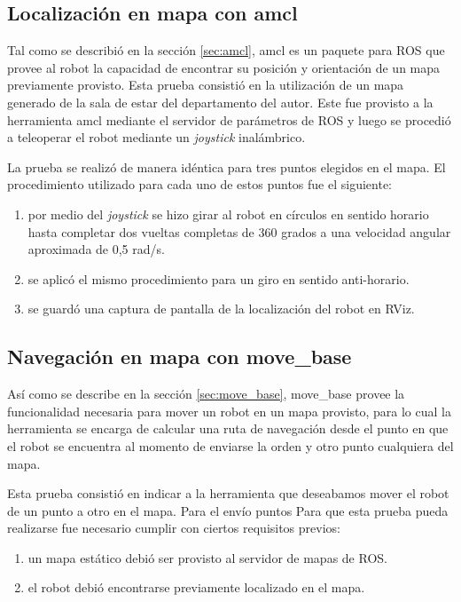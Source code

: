
\subsection{Localización en mapa con amcl}

Tal como se describió en la sección \ref{sec:amcl}, amcl es un paquete para ROS que provee al robot la capacidad de encontrar su posición y orientación de un mapa previamente provisto. Esta prueba consistió en la utilización de un mapa generado de la sala de estar del departamento del autor. Este fue provisto a la herramienta amcl mediante el servidor de parámetros de ROS y luego se procedió a teleoperar el robot mediante un \textit{joystick} inalámbrico.

La prueba se realizó de manera idéntica para tres puntos elegidos en el mapa. El procedimiento utilizado para cada uno de estos puntos fue el siguiente:

\begin{enumerate}
    \item por medio del \textit{joystick} se hizo girar al robot en círculos en sentido horario hasta completar dos vueltas completas de 360 grados a una velocidad angular aproximada de 0,5 rad/s.
    \item se aplicó el mismo procedimiento para un giro en sentido anti-horario.
    \item se guardó una captura de pantalla de la localización del robot en RViz.
\end{enumerate}


\subsection{Navegación en mapa con move\_base}

Así como se describe en la sección \ref{sec:move_base}, move\_base provee la funcionalidad necesaria para mover un robot en un mapa provisto, para lo cual la herramienta se encarga de calcular una ruta de navegación desde el punto en que el robot se encuentra al momento de enviarse la orden y otro punto cualquiera del mapa.

Esta prueba consistió en indicar a la herramienta que deseabamos mover el robot de un punto a otro en el mapa. Para el envío puntos
Para que esta prueba pueda realizarse fue necesario cumplir con ciertos requisitos previos:

\begin{enumerate}
    \item un mapa estático debió ser provisto al servidor de mapas de ROS.
    \item el robot debió encontrarse previamente localizado en el mapa.
\end{enumerate}
